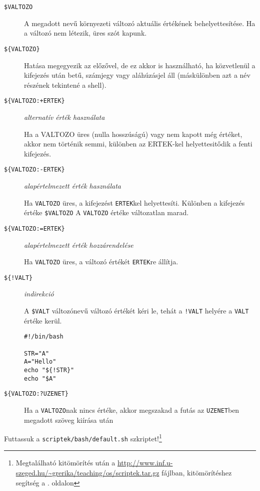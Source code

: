\begin{description}
\item[\tt\$VALTOZO] A megadott nevű környezeti változó aktuális értékének behelyettesítése. Ha a változó nem létezik, üres szót kapunk.
\item[\tt\$\{VALTOZO\}] Hatása megegyezik az előzővel, de ez akkor is használható, ha közvetlenül a kifejezés után betű, számjegy vagy aláhúzásjel 
	áll (máskülönben azt a név részének tekintené a shell).
\item[\tt\$\{VALTOZO:+ERTEK\}]  \emph{alternatív érték használata} \hfill

	Ha a VALTOZO üres (nulla hosszúságú) vagy nem kapott még értéket, akkor nem történik semmi, különben az ERTEK-kel helyettesitődik a fenti kifejezés.

\item[\tt\$\{VALTOZO:-ERTEK\}] \emph{alapértelmezett érték használata}\hfill
	
	Ha \verb.VALTOZO. üres, a kifejezést \verb.ERTEK.kel helyettesíti. Különben a kifejezés értéke \verb.$VALTOZO. 
	A \verb.VALTOZO. értéke változatlan marad.

\item[\tt\$\{VALTOZO:=ERTEK\}] \emph{alapértelmezett érték hozzárendelése}\hfill
	
	Ha \verb.VALTOZO. üres, a változó értékét \verb.ERTEK.re állítja. 

\item[\tt\$\{!VALT\}] \emph{indirekció}\hfill

	A \verb.$VALT. változónevű változó értékét kéri le, tehát a \verb.!VALT. helyére  a \verb.VALT. értéke kerül.

\begin{lstlisting}
#!/bin/bash

STR="A"
A="Hello"
echo "${!STR}"
echo "$A"
\end{lstlisting}

\item[\tt\$\{VALTOZO:?UZENET\}] Ha a \verb.VALTOZO.nak nincs értéke, akkor megszakad a futás az \verb.UZENET.ben 
    megadott szöveg kiírása után
\end{description}

Futtassuk a \texttt{scriptek/bash/default.sh} szkriptet!\footnote{Megtalálható kitömörítés után a \url{http://www.inf.u-szeged.hu/~grerika/teaching/os/scriptek.tar.gz} fájlban, kitömörítéshez segítség a \pageref{subsec:archiv}. oldalon}



